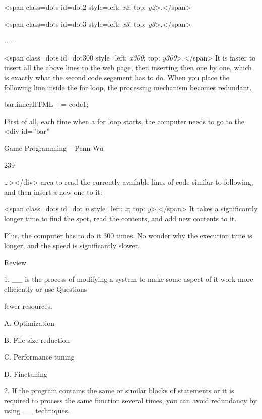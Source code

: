 \documentclass[
]{article}
\begin{document}
\textless span class=dots id=dot2 style=\textquotesingle left:
\emph{x2}; top:
\emph{y2}\textquotesingle\textgreater.\textless/span\textgreater{}

\textless span class=dots id=dot3 style=\textquotesingle left:
\emph{x3}; top:
\emph{y3}\textquotesingle\textgreater.\textless/span\textgreater{}

......

\textless span class=dots id=dot300 style=\textquotesingle left:
\emph{x300}; top:
\emph{y300}\textquotesingle\textgreater.\textless/span\textgreater{} It
is faster to insert all the above lines to the web page, then inserting
then one by one, which is exactly what the second code segement has to
do. When you place the following line inside the for loop, the
processing mechanism becomes redundant.

bar.innerHTML += code1;

First of all, each time when a for loop starts, the computer needs to go
to the \textless div id=''bar''

Game Programming -- Penn Wu

239

\protect\hypertarget{index_split_012.htmlux5cux23p240}{}{}\ldots\textgreater\textless/div\textgreater{}
area to read the currently available lines of code similar to following,
and then insert a new one to it:

\textless span class=dots id=dot \emph{n} style=\textquotesingle left:
\emph{x}; top:
\emph{y}\textquotesingle\textgreater.\textless/span\textgreater{} It
takes a significantly longer time to find the spot, read the contents,
and add new contents to it.

Plus, the computer has to do it 300 times. No wonder why the execution
time is longer, and the speed is significantly slower.

Review

1. \_\_ is the process of modifying a system to make some aspect of it
work more efficiently or use Questions

fewer resources.

A. Optimization

B. File size reduction

C. Performance tuning

D. Finetuning

2. If the program contains the same or similar blocks of statements or
it is required to process the same function several times, you can avoid
redundancy by using \_\_ techniques.
\end{document}
